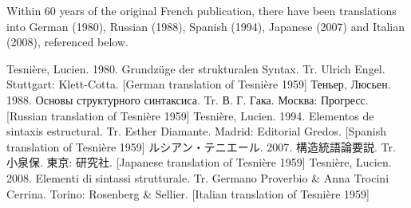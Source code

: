 Within 60 years of the original French publication, there have been translations into German (1980), Russian (1988), Spanish (1994), Japanese (2007) and Italian (2008), referenced below.

Tesnière, Lucien. 1980. Grundzüge der strukturalen Syntax. Tr. Ulrich Engel. Stuttgart: Klett-Cotta. [German translation of Tesnière 1959]
Теньер, Люсьен. 1988. Основы структурного синтаксиса. Tr.  В. Г. Гака. Москва: Прогресс. [Russian translation of Tesnière 1959]
Tesnière, Lucien. 1994. Elementos de sintaxis estructural. Tr. Esther Diamante. Madrid: Editorial Gredos. [Spanish translation of Tesnière 1959]
ルシアン・テニエール. 2007. 構造統語論要説. Tr. 小泉保. 東京: 研究社. [Japanese translation of Tesnière 1959]
Tesnière, Lucien. 2008. Elementi di sintassi strutturale. Tr. Germano Proverbio & Anna Trocini Cerrina. Torino: Rosenberg & Sellier. [Italian translation of Tesnière 1959]


\fi





